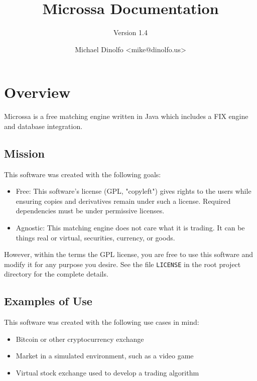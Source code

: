 \documentclass[Letter]{article}
\title{Microssa Documentation}
\date{Michael Dinolfo <mike@dinolfo.us>}
\author{Version 1.4}
\begin{document}
\maketitle
\newpage
\tableofcontents
\newpage
{}

\section{Overview}

Microssa is a free matching engine written in Java which includes a FIX engine and database integration.


\subsection{Mission}

This software was created with the following goals:

\begin{itemize}
    \item Free: This software's license (GPL, "copyleft")
    gives rights to the users while ensuring copies and derivatives
    remain under such a license.  Required dependencies must
    be under permissive licenses.
    \item Agnostic: This matching engine does not care
    what it is trading.  It can be things real or virtual, securities,
    currency, or goods.
\end{itemize}

However, within the terms the GPL license, you are free to use this
software and modify it for any purpose you desire.  See the file
\texttt{LICENSE} in the root project directory for the complete details.


\subsection{Examples of Use}

This software was created with the following use cases in mind:

\begin{itemize}
    \item Bitcoin or other cryptocurrency exchange
    \item Market in a simulated environment, such as a video game
    \item Virtual stock exchange used to develop a trading algorithm
\end{itemize}
\end{document}
